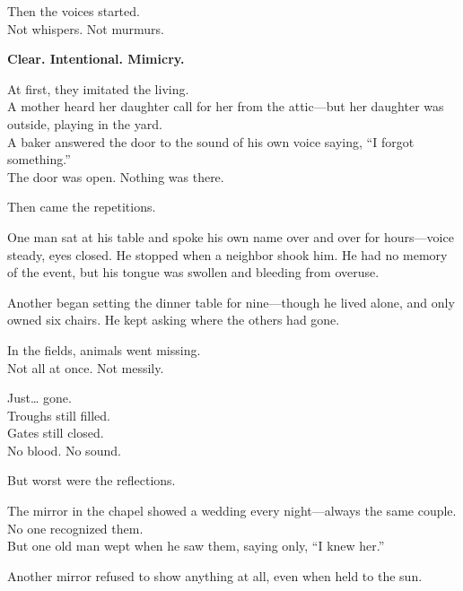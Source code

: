 \documentclass[12pt]{article}
\begin{document}
\vspace{0.5em}
Then the voices started.\\
Not whispers. Not murmurs.

\vspace{0.5em}
\textbf{Clear. Intentional. Mimicry.}

\vspace{0.5em}
At first, they imitated the living.\\
A mother heard her daughter call for her from the attic---but her daughter was outside, playing in the yard.\\
A baker answered the door to the sound of his own voice saying, ``I forgot something.''\\
The door was open. Nothing was there.

\vspace{0.5em}
Then came the repetitions.

\vspace{0.5em}
One man sat at his table and spoke his own name over and over for hours---voice steady, eyes closed. He stopped when a neighbor shook him. He had no memory of the event, but his tongue was swollen and bleeding from overuse.

\vspace{0.5em}
Another began setting the dinner table for nine---though he lived alone, and only owned six chairs. He kept asking where the others had gone.

\vspace{0.5em}
In the fields, animals went missing.\\
Not all at once. Not messily.

\vspace{0.5em}
Just\ldots{} gone.\\
Troughs still filled.\\
Gates still closed.\\
No blood. No sound.

\vspace{0.5em}
But worst were the reflections.

\vspace{0.5em}
The mirror in the chapel showed a wedding every night---always the same couple.\\
No one recognized them.\\
But one old man wept when he saw them, saying only, ``I knew her.''

\vspace{0.5em}
Another mirror refused to show anything at all, even when held to the sun.
\end{document}
